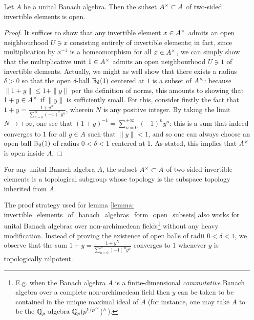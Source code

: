         \begin{lemma} \label{lemma: invertible_elements_of_banach_algebras_form_open_subsets}
            Let $A$ be a unital Banach algebra. Then the subset $A^{\x} \subset A$ of two-sided invertible elements is open.
        \end{lemma}
            \begin{proof}
                It suffices to show that any invertible element $x \in A^{\x}$ admits an open neighbourhood $U \ni x$ consisting entirely of invertible elements; in fact, since multiplication by $x^{-1}$ is a homeomorphism for all $x \in A^{\x}$, we can simply show that the multiplicative unit $1 \in A^{\x}$ admits an open neighbourhood $U \ni 1$ of invertible elements. Actually, we might as well show that there exists a radius $\delta > 0$ so that the open $\delta$-ball $\mathbb{B}_{\delta}(1)$ centered at $1$ is a subset of $A^{\x}$: because $\|1 + y\| \leq 1 + \|y\|$ per the definition of norms, this amounts to showing that $1 + y \in A^{\x}$ if $\|y\|$ is sufficiently small. For this, consider firstly the fact that $1 + y = \frac{1 + y^N}{\sum_{n = 0}^N (-1)^n y^n}$, wherein $N$ is any positive integer. By taking the limit $N \to +\infty$, one see that $(1 + y)^{-1} = \sum_{n = 0}^{+\infty} (-1)^n y^n$: this is a sum that indeed converges to $1$ for all $y \in A$ such that $\|y\| < 1$, and so one can always choose an open ball $\mathbb{B}_{\delta}(1)$ of radius $0 < \delta < 1$ centered at $1$. As stated, this implies that $A^{\x}$ is open inside $A$.
            \end{proof}
        \begin{corollary}
            For any unital Banach algebra $A$, the subset $A^{\x} \subset A$ of two-sided invertible elements is a topological subgroup whose topology is the subspace topology inherited from $A$. 
        \end{corollary}
        \begin{remark}
            The proof strategy used for lemma \ref{lemma: invertible_elements_of_banach_algebras_form_open_subsets} also works for unital Banach algebras over non-archimedean fields\footnote{E.g. when the Banach algebra $A$ is a finite-dimensional \textit{commutative} Banach algebra over a complete non-archimedean field then $y$ can be taken to be contained in the unique maximal ideal of $A$ (for instance, one may take $A$ to be the $\mathbb{Q}_p$-algebra $\mathbb{Q}_p(p^{1/p^{\infty}})^{\wedge}$).} without any heavy modification. Instead of proving the existence of open balls of radii $0 < \delta < 1$, we observe that the sum $1 + y = \frac{1 + y^N}{\sum_{n = 0}^N (-1)^n y^n}$ converges to $1$ whenever $y$ is topologically nilpotent. 
        \end{remark}
